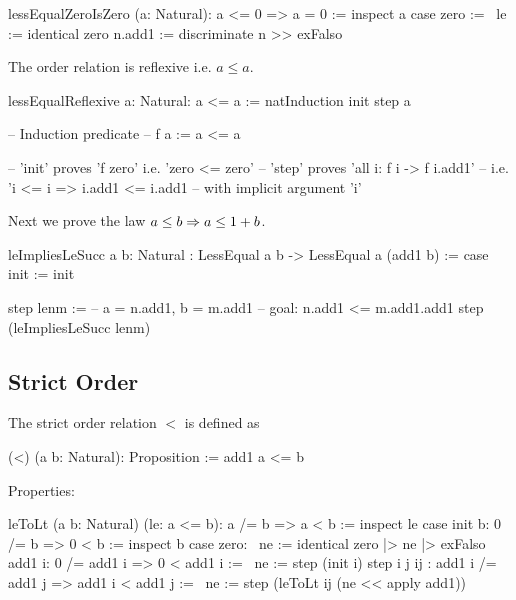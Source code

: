 \begin{alba}
    lessEqualZeroIsZero (a: Natural): a <= 0 => a = 0 :=
        inspect a case
            zero :=
                \ le := identical zero
            n.add1 :=
                discriminate {n} >> exFalso
\end{alba}





\noindent The order relation is reflexive i.e. $a \le a$.

\begin{alba}
    lessEqualReflexive {a: Natural}: a <= a :=
        natInduction init step a

    -- Induction predicate
    -- f a := a <= a

    -- 'init' proves 'f zero' i.e. 'zero <= zero'
    -- 'step' proves 'all i: f i -> f i.add1'
    --     i.e. 'i <= i => i.add1 <= i.add1
    --     with implicit argument 'i'
\end{alba}



\noindent Next we prove the law $a \le b \Rightarrow a \le 1 + b$.

\begin{alba}
    leImpliesLeSucc
        {a b: Natural}
        :  LessEqual a b  ->  LessEqual a (add1 b)
    :=
        case
            init :=
                init

            step lenm :=
                -- a = n.add1, b = m.add1
                -- goal: n.add1 <= m.add1.add1
                step (leImpliesLeSucc lenm)
\end{alba}











\subsection{Strict Order}

\noindent The strict order relation $<$ is defined as

\begin{alba}
  (<) (a b: Natural): Proposition :=
    add1 a <= b
\end{alba}

Properties:

\begin{alba}
    leToLt (a b: Natural) (le: a <= b): a /= b => a < b :=
        inspect le case
            init b: 0 /= b => 0 < b :=
                inspect b case
                    zero: \ ne := identical zero |> ne |> exFalso
                    add1 i: 0 /= add1 i => 0 < add1 i :=
                        \ ne := step (init i)
            step i j ij
            : add1 i /= add1 j => add1 i < add1 j :=
                \ ne :=
                    step (leToLt ij (ne << apply add1))
\end{alba}


